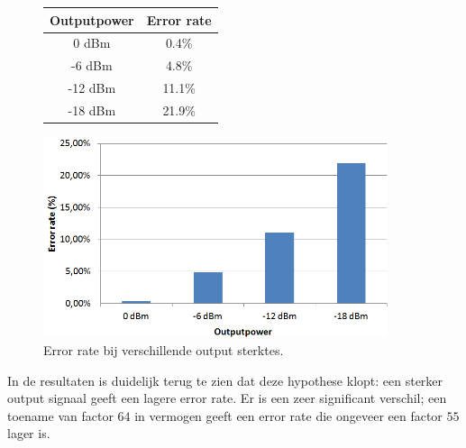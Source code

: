 \documentclass[a4paper,10pt]{article}
\begin{document}
\begin{figure}[h!]
    \begin{minipage}{\textwidth}
        \begin{minipage}{0.49\textwidth}
            \centering
            \begin{tabular}{cc}\hline
                Outputpower &  Error rate   \\ \hline
                0 dBm       &  0.4\%        \\
                -6 dBm      &  4.8\%        \\
                -12 dBm     &  11.1\%       \\
                -18 dBm     &  21.9\%	\\ \hline
            \end{tabular}
        \end{minipage}
        \hfill
        \begin{minipage}{0.49\textwidth}
            \centering
            \includegraphics[width=0.9\textwidth]{outputpower.png}
        \end{minipage}
        \caption{Error rate bij verschillende output sterktes.}
    \end{minipage}
\end{figure}
In de resultaten is duidelijk terug te zien dat deze hypothese klopt: een sterker output signaal geeft een lagere error rate. Er is een zeer significant verschil; een toename van factor $64$ in vermogen geeft een error rate die ongeveer een factor $55$ lager is.
\end{document}
